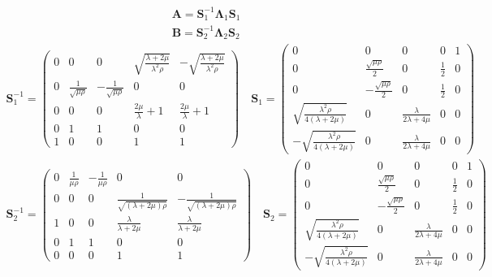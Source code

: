 \begin{gather*}
    \pmb{A} = \pmb{S}^{-1}_1 \pmb{\Lambda}_1 \pmb{S}_1 \\
    \pmb{B} = \pmb{S}^{-1}_2 \pmb{\Lambda}_2 \pmb{S}_2
\end{gather*}
\begin{gather*}
    \pmb{S}^{-1}_1 = 
    \begin{pmatrix}
        0 & 0 & 0 & \sqrt{\frac{\lambda + 2\mu}{\lambda^2 \rho}} & -\sqrt{\frac{\lambda + 2\mu}{\lambda^2 \rho}} \\
        0 & \frac{1}{\sqrt{\mu\rho}} & -\frac{1}{\sqrt{\mu\rho}} & 0 & 0 \\
        0 & 0 & 0 & \frac{2\mu}{\lambda} + 1 & \frac{2\mu}{\lambda} + 1 \\
        0 & 1 & 1 & 0 & 0 \\
        1 & 0 & 0 & 1 & 1
    \end{pmatrix}
    \quad
    \pmb{S}_1 = 
    \begin{pmatrix}
        0 & 0 & 0 & 0 & 1 \\
        0 & \frac{\sqrt{\mu\rho}}{2} & 0 & \frac{1}{2} & 0 \\
        0 & -\frac{\sqrt{\mu\rho}}{2} & 0 & \frac{1}{2} & 0 \\
        \sqrt{\frac{\lambda^2 \rho}{4\left(\lambda+2\mu\right)}} & 0 & \frac{\lambda}{2\lambda + 4\mu} & 0 & 0 \\
        -\sqrt{\frac{\lambda^2 \rho}{4\left(\lambda+2\mu\right)}} & 0 & \frac{\lambda}{2\lambda + 4\mu} & 0 & 0
    \end{pmatrix}
\end{gather*}
\begin{gather*}
    \pmb{S}^{-1}_2 = 
    \begin{pmatrix}
        0 & \frac{1}{\mu\rho} & -\frac{1}{\mu\rho} & 0 & 0 \\
        0 & 0 & 0 & \frac{1}{\sqrt{\left(\lambda+2\mu\right)\rho}} & -\frac{1}{\sqrt{\left(\lambda+2\mu\right)\rho}} \\
        1 & 0 & 0 & \frac{\lambda}{\lambda+2\mu} & \frac{\lambda}{\lambda+2\mu} \\
        0 & 1 & 1 & 0 & 0 \\
        0 & 0 & 0 & 1 & 1
    \end{pmatrix}
    \quad
    \pmb{S}_2 = 
    \begin{pmatrix}
        0 & 0 & 0 & 0 & 1 \\
        0 & \frac{\sqrt{\mu\rho}}{2} & 0 & \frac{1}{2} & 0 \\
        0 & -\frac{\sqrt{\mu\rho}}{2} & 0 & \frac{1}{2} & 0 \\
        \sqrt{\frac{\lambda^2 \rho}{4\left(\lambda+2\mu\right)}} & 0 & \frac{\lambda}{2\lambda + 4\mu} & 0 & 0 \\
        -\sqrt{\frac{\lambda^2 \rho}{4\left(\lambda+2\mu\right)}} & 0 & \frac{\lambda}{2\lambda + 4\mu} & 0 & 0
    \end{pmatrix}
\end{gather*}

